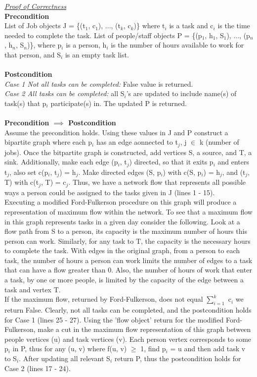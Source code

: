 \documentclass[10pt]{csc_assignment}
\begin{document}
\begin{description}
\emph{\underline{Proof of Correctness}}\\
\textbf{Precondition}\\
List of Job objects J = \{(t$_{1}$, c$_{1}$), ..., (t$_{k}$, c$_{k}$)\} where t$_{i}$ is a task and c$_{i}$ is the time needed to complete the task. List of people/staff objects P = \{(p$_{1}$, h$_{1}$, S$_{1}$), ..., (p$_{n}$, h$_{n}$, S$_{n}$)\}, where p$_{i}$ is a person, h$_{i}$ is the number of hours available to work for that person, and S$_{i}$ is an empty task list.\\
\\
\textbf{Postcondition}\\
\emph{Case 1 Not all tasks can be completed:} False value is returned.\\
\emph{Case 2 All tasks can be completed:} all S$_{i}$'s are updated to include name(s) of task(s) that p$_{i}$ participate(s) in. The updated P is returned.\\ 
\\
\textbf{Precondition $\implies$ Postcondition}\\ 
Assume the precondition holds. Using these values in J and P construct a bipartite graph where each p$_{i}$ has an edge aonnected to t$_{j}$, j $\in$ k (number of jobs). Once the bitpartite graph is constructed, add vertices S, a source, and T, a sink. Additionally, make each edge (p$_{i}$, t$_{j}$) directed, so that it exits p$_{i}$ and enters  t$_{j}$, also set c(p$_{i}$, t$_{j}$) = h$_{j}$. Make directed edges (S, p$_{i}$) with c(S, p$_{i}$) = h$_{j}$, and (t$_{j}$, T) with c(t$_{j}$, T) = c$_{j}$. Thus, we have a network flow that represents all possible ways a person could be assigned to the tasks given in J (lines 1 - 15). \\
Executing a modified Ford-Fulkerson procedure on this graph will produce a representation of maximum flow within the network. To see that a maximum flow in this graph represents tasks in a given day consider the following. Look at a flow path from S to a person, its capacity is the maximum number of hours this person can work. Similarly, for any task to T, the capacity is the necessary hours to complete the task. With edges in the original graph, from a person to each task, the number of hours a person can work limits the number of edges to a task that can have a flow greater than 0. Also, the number of hours of work that enter a task, by one or more people, is limited by the capacity of the edge between a task and vertex T. \\
If the maximum flow, returned by Ford-Fulkerson, does not equal $\sum_{i = 1}^{k}$ c$_{i}$ we return False. Clearly, not all tasks can be completed, and the postcondition holds for Case 1 (lines 25 - 27). Using the 'flow object' return for the modified Ford-Fulkerson, make a cut in the maximum flow representation of this graph between people vertices (u) and task vertices (v). Each person vertex corresponds to some p$_{i}$ in P, thus for any (u, v) where f(u, v) $\geqslant$ 1, find p$_{i}$ = u and then add task v to S$_{i}$. After updating all relevant S$_{i}$ return P, thus the postcondition holds for Case 2 (lines 17 - 24).\\

\end{description}
\end{document}
